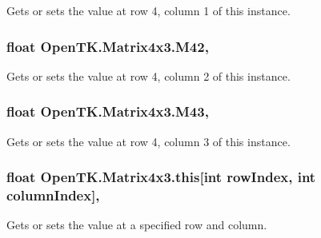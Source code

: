 Gets or sets the value at row 4, column 1 of this instance. 

\hypertarget{struct_open_t_k_1_1_matrix4x3_a18b69d118b277ec4ce117e4f325c083d}{
\subsubsection[{M42}]{\setlength{\rightskip}{0pt plus 5cm}float Open\-T\-K.\-Matrix4x3.\-M42\hspace{0.3cm}{\ttfamily [get]}, {\ttfamily [set]}}}\label{struct_open_t_k_1_1_matrix4x3_a18b69d118b277ec4ce117e4f325c083d}


Gets or sets the value at row 4, column 2 of this instance. 

\hypertarget{struct_open_t_k_1_1_matrix4x3_a8768acd118f618a60ccbfb6d2d878c33}{
\subsubsection[{M43}]{\setlength{\rightskip}{0pt plus 5cm}float Open\-T\-K.\-Matrix4x3.\-M43\hspace{0.3cm}{\ttfamily [get]}, {\ttfamily [set]}}}\label{struct_open_t_k_1_1_matrix4x3_a8768acd118f618a60ccbfb6d2d878c33}


Gets or sets the value at row 4, column 3 of this instance. 

\hypertarget{struct_open_t_k_1_1_matrix4x3_a704905cb18abe61215b641d8f1bc63be}{
\subsubsection[{this[int row\-Index, int column\-Index]}]{\setlength{\rightskip}{0pt plus 5cm}float Open\-T\-K.\-Matrix4x3.\-this\mbox{[}int row\-Index, int column\-Index\mbox{]}\hspace{0.3cm}{\ttfamily [get]}, {\ttfamily [set]}}}\label{struct_open_t_k_1_1_matrix4x3_a704905cb18abe61215b641d8f1bc63be}


Gets or sets the value at a specified row and column. 

